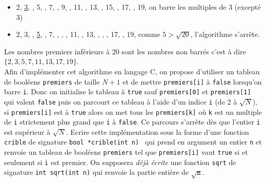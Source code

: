 \documentclass[11pt,a4paper]{article}
\begin{document}
\begin{Exercise}[title = {Un tableau qui connait sa taille}]
{\begin{itemize}
	\item 2, \underline{3}, , 5, , 7, , 9, , 11, , 13, , 15, , 17, , 19,  on barre les multiples de 3 (excepté 3)
	\item 2, 3, , \underline{5}, , 7, , , , 11, , 13, , , , 17, , 19,  comme $5 > \sqrt{20}$, l'algorithme s'arrête.
	\end{itemize}
	Les nombres premiers inférieurs à 20 sont les nombres non barrés c'est à dire $\{2, 3, 5, 7, 11, 13, 17, 19\}$.\\
	Afin d'implémenter cet algorithme en langage C, on propose d'utiliser un tableau de booléens {\tt premiers} de taille $N+1$ et de mettre {\tt premiers[i]} à {\tt false} lorsqu'on barre {\tt i}. Donc on initialise le tableau à {\tt true} sauf {\tt premiers[0]} et {\tt premiers[1]} qui valent {\tt false} puis on parcourt ce tableau à l'aide d'un indice {\tt i} (de 2 à $\sqrt{N}$), si {\tt premiers[i]} est à {\tt true} alors on met tous les {\tt premiers[k]} où {\tt k} est un multiple de {\tt i} strictement plus grand que {\tt i} à {\tt false}. Ce parcours s'arrête dès que l'entier {\tt i} est supérieur à $\sqrt{N}$. Ecrire cette implémentation sous la forme d'une fonction {\tt crible} de signature \texttt{bool *crible(int n)
} qui prend en argument un entier {\tt n} et renvoie un tableau de booléens {\tt premiers} tel que {\tt premiers[i]} vaut {\tt true} si et seulement si {\tt i} est premier. On supposera \textit{déjà écrite} une fonction {\tt sqrt} de signature {\tt int sqrt(int n)} qui renvoie la partie entière de $\sqrt{\mathtt{n}}$.
	}
	\ifcorrige
	\fi
	\ifcorrige
	\fi
\end{Exercise}
\end{document}
